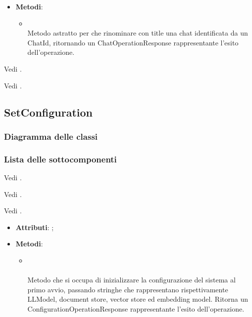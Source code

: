 \documentclass[10pt, a4paper]{article}
\begin{document}
\label{RenameChatUseCaseDettaglio}
\begin{itemize}
    \item \textbf{Metodi}:
    \begin{itemize}
        \item {}\\
        Metodo astratto per che rinominare con title una chat identificata da un ChatId, ritornando un ChatOperationResponse rappresentante l'esito dell'operazione.
    \end{itemize}
\end{itemize}


Vedi .



Vedi .


\subsection{SetConfiguration}
\subsubsection{Diagramma delle classi}
\subsubsection{Lista delle sottocomponenti}


Vedi .

Vedi .

Vedi .

\label{SetConfigurationControllerDettaglio}
\begin{itemize}
    \item \textbf{Attributi}: ;
    \item \textbf{Metodi}:
    \begin{itemize}
        \item {}\\\\
        Metodo che si occupa di inizializzare la configurazione del sistema al primo avvio, passando stringhe che rappresentano rispettivamente LLModel, document store, vector store ed embedding model. Ritorna un ConfigurationOperationResponse rappresentante l'esito dell'operazione.
    \end{itemize}
\end{itemize}
\end{document}
